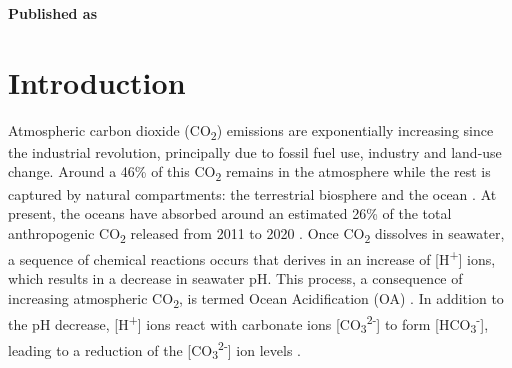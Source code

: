 \vspace{3cm}





\textbf{Published as}

\vspace{0.5cm}


\newpage
\section{Introduction}

Atmospheric carbon dioxide (CO\textsubscript{2}) emissions are
exponentially increasing since the industrial revolution, principally due to
fossil fuel use, industry and land-use change. Around a 46\% of this
CO\textsubscript{2} remains in the atmosphere while the rest is captured by
natural compartments: the terrestrial biosphere and the
ocean \cite{Friedlingstein2021}.  At present, the oceans have absorbed around
an
estimated 26\% of the total anthropogenic CO\textsubscript{2} released from
2011 to 2020 \cite{Friedlingstein2021}. Once CO\textsubscript{2} dissolves in
seawater, a sequence of chemical reactions occurs that derives in an increase
of [H\textsuperscript{+}] ions, which results in a decrease in seawater pH.
This process, a consequence of increasing atmospheric CO\textsubscript{2}, is
termed Ocean Acidification (OA) \cite{caldeira2003anthropogenic}. In addition
to the pH decrease, [H\textsuperscript{+}] ions react with carbonate ions
    [CO\textsubscript{3}\textsuperscript{2-}] to form
    [HCO\textsubscript{3}\textsuperscript{-}], leading to a reduction of the
    [CO\textsubscript{3}\textsuperscript{2-}] ion levels \cite{doney2009ocean}.

